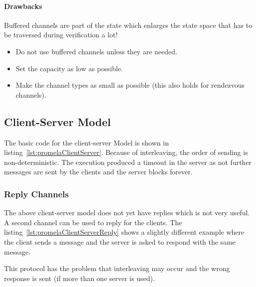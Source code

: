 				\paragraph{Drawbacks}
					Buffered channels are part of the state which enlarges the state space that has to be traversed during verification a lot!

					\begin{itemize}
						\item Do not use buffered channels unless they are needed.
						\item Set the capacity as low as possible.
						\item Make the channel types as small as possible (this also holds for rendezvous channels).
					\end{itemize}

		\subsection{Client-Server Model}
			

			The basic code for the client-server Model is shown in listing~\ref{lst:promelaClientServer}. Because of interleaving, the order of sending is non-deterministic. The execution
			produced a timeout in the server as not further messages are sent by the clients and the server blocks forever.

			\subsubsection{Reply Channels}
				

				The above client-server model does not yet have replies which is not very useful. A second channel can be used to reply for the clients. The listing~\ref{lst:promelaClientServerReply} shows a slightly different example where the client sends a message and the server is asked to respond with the same message.

				This protocol has the problem that interleaving may occur and the wrong response is sent (if more than one server is used).

